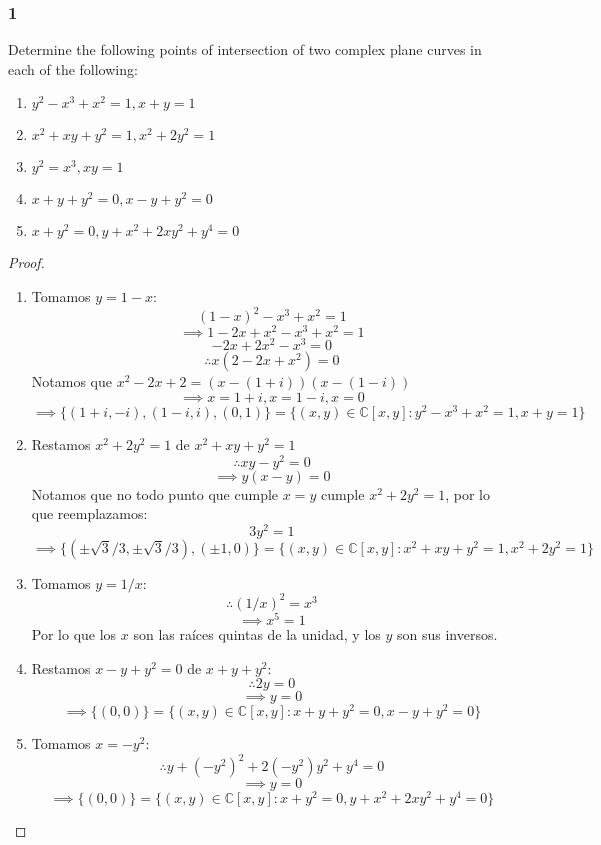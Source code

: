 \documentclass[11pt]{article}
\newcommand{\set}[1]{\mathbb{#1}}
\theoremstyle{definition}
\begin{document}
        \subsubsection{1}
        Determine the following points of intersection of two complex plane curves in each of the following:
        \begin{enumerate}[label=\textbf{(\alph*)}]
            \item $y^2-x^3+x^2=1, x+y=1$

            \item $x^2+xy+y^2=1, x^2+2y^2=1$

            \item $y^2=x^3,xy=1$

            \item $x+y+y^2=0,x-y+y^2=0$

            \item $x+y^2=0,y+x^2+2xy^2+y^4=0$
        \end{enumerate}
        \begin{proof}    
            \begin{enumerate}[label=\textbf{(\alph*)}]
                \item Tomamos $y=1-x$:
                \[(1-x)^2-x^3+x^2=1\]
                \[\implies 1-2x+x^2-x^3+x^2=1\]
                \[-2x+2x^2-x^3=0\]
                \[\therefore x(2-2x+x^2)=0\]
                Notamos que $x^2-2x+2=(x-(1+i))(x-(1-i))$
                \[\implies x=1+i,x=1-i,x=0\]
                \[\implies \{(1+i,-i),(1-i,i),(0,1)\}=\{(x,y)\in\set{C}[x,y]:y^2-x^3+x^2=1,x+y=1\}\]

                \item Restamos $x^2+2y^2=1$ de $x^2+xy+y^2=1$
                \[\therefore xy-y^2=0\]
                \[\implies y(x-y)=0\]
                Notamos que no todo punto que cumple $x=y$ cumple $x^2+2y^2=1$, por lo que reemplazamos:
                \[3y^2=1\]
                \[\implies \{(\pm\sqrt{3}/3,\pm\sqrt{3}/3),(\pm 1,0)\}=\{(x,y)\in\set{C}[x,y]:x^2+xy+y^2=1, x^2+2y^2=1\}\]

                \item Tomamos $y=1/x$:
                \[\therefore (1/x)^2=x^3\]
                \[\implies x^5=1\]
                Por lo que los $x$ son las raíces quintas de la unidad, y los $y$ son sus inversos.

                \item Restamos $x-y+y^2=0$ de $x+y+y^2$:
                \[\therefore 2y=0\]
                \[\implies y=0\]
                \[\implies \{(0,0)\}=\{(x,y)\in\set{C}[x,y]:x+y+y^2=0,x-y+y^2=0\}\]

                \item Tomamos $x=-y^2$:
                \[\therefore y+(-y^2)^2+2(-y^2)y^2+y^4=0\]
                \[\implies y=0\]
                \[\implies \{(0,0)\}=\{(x,y)\in\set{C}[x,y]:x+y^2=0,y+x^2+2xy^2+y^4=0\}\]
            \end{enumerate}
        \end{proof}
\end{document}
